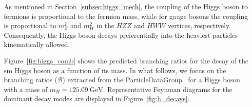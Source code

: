 As mentioned in Section~\ref{subsec:higgs_mech}, the coupling of the Higgs boson to fermions is proportional to the fermion mass, while for gauge bosons the coupling is proportional to \(m_Z^2\) and \(m_W^2\) in the \(HZZ\) and \(HWW\) vertices, respectively. Consequently, the Higgs boson decays preferentially into the heaviest particles kinematically allowed.

Figure~\ref{fig:higgs_comb} shows the predicted branching ratios for the decay of the \acrshort{sm} Higgs boson as a function of its mass. In what follows, we focus on the branching ratios (\(\mathcal{B}\)) extracted from the ParticleDataGroup~\cite{ParticleDataGroup} for a Higgs boson with a mass of \(m_H = 125.09~\mathrm{GeV}\). Representative Feynman diagrams for the dominant decay modes are displayed in Figure~\ref{fig:h_decays}.

